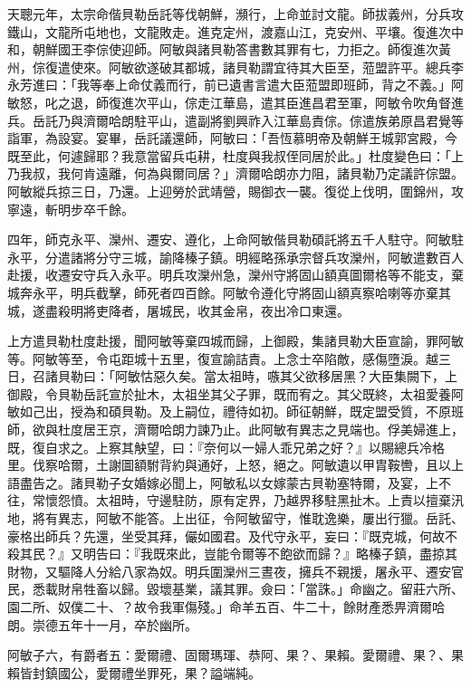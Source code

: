 \begin{pinyinscope}
天聰元年，太宗命偕貝勒岳託等伐朝鮮，瀕行，上命並討文龍。師拔義州，分兵攻鐵山，文龍所屯地也，文龍敗走。進克定州，渡嘉山江，克安州、平壤。復進次中和，朝鮮國王李倧使迎師。阿敏與諸貝勒答書數其罪有七，力拒之。師復進次黃州，倧復遣使來。阿敏欲遂破其都城，諸貝勒謂宜待其大臣至，蒞盟許平。總兵李永芳進曰：「我等奉上命仗義而行，前已遺書言遣大臣蒞盟即班師，背之不義。」阿敏怒，叱之退，師復進次平山，倧走江華島，遣其臣進昌君至軍，阿敏令吹角督進兵。岳託乃與濟爾哈朗駐平山，遣副將劉興祚入江華島責倧。倧遣族弟原昌君覺等詣軍，為設宴。宴畢，岳託議還師，阿敏曰：「吾恆慕明帝及朝鮮王城郭宮殿，今既至此，何遽歸耶？我意當留兵屯耕，杜度與我叔侄同居於此。」杜度變色曰：「上乃我叔，我何肯遠離，何為與爾同居？」濟爾哈朗亦力阻，諸貝勒乃定議許倧盟。阿敏縱兵掠三日，乃還。上迎勞於武靖營，賜御衣一襲。復從上伐明，圍錦州，攻寧遠，斬明步卒千餘。

四年，師克永平、灤州、遷安、遵化，上命阿敏偕貝勒碩託將五千人駐守。阿敏駐永平，分遣諸將分守三城，諭降榛子鎮。明經略孫承宗督兵攻灤州，阿敏遣數百人赴援，收遷安守兵入永平。明兵攻灤州急，灤州守將固山額真圖爾格等不能支，棄城奔永平，明兵截擊，師死者四百餘。阿敏令遵化守將固山額真察哈喇等亦棄其城，遂盡殺明將吏降者，屠城民，收其金帛，夜出冷口東還。

上方遣貝勒杜度赴援，聞阿敏等棄四城而歸，上御殿，集諸貝勒大臣宣諭，罪阿敏等。阿敏等至，令屯距城十五里，復宣諭詰責。上念士卒陷敵，感傷墮淚。越三日，召諸貝勒曰：「阿敏怙惡久矣。當太祖時，嗾其父欲移居黑？大臣集闕下，上御殿，令貝勒岳託宣於扯木，太祖坐其父子罪，既而宥之。其父既終，太祖愛養阿敏如己出，授為和碩貝勒。及上嗣位，禮待如初。師征朝鮮，既定盟受質，不原班師，欲與杜度居王京，濟爾哈朗力諫乃止。此阿敏有異志之見端也。俘美婦進上，既，復自求之。上察其觖望，曰：『奈何以一婦人乖兄弟之好？』以賜總兵冷格里。伐察哈爾，土謝圖額駙背約與通好，上怒，絕之。阿敏遺以甲胄鞍轡，且以上語盡告之。諸貝勒子女婚嫁必聞上，阿敏私以女嫁蒙古貝勒塞特爾，及宴，上不往，常懷怨憤。太祖時，守邊駐防，原有定界，乃越界移駐黑扯木。上責以擅棄汛地，將有異志，阿敏不能答。上出征，令阿敏留守，惟耽逸樂，屢出行獵。岳託、豪格出師兵？先還，坐受其拜，儼如國君。及代守永平，妄曰：『既克城，何故不殺其民？』又明告曰：『我既來此，豈能令爾等不飽欲而歸？』略榛子鎮，盡掠其財物，又驅降人分給八家為奴。明兵圍灤州三晝夜，擁兵不親援，屠永平、遷安官民，悉載財帛牲畜以歸。毀壞基業，議其罪。僉曰：「當誅。」命幽之。留莊六所、園二所、奴僕二十、？故令我軍傷殘。」命羊五百、牛二十，餘財產悉畀濟爾哈朗。崇德五年十一月，卒於幽所。

阿敏子六，有爵者五：愛爾禮、固爾瑪琿、恭阿、果？、果賴。愛爾禮、果？、果賴皆封鎮國公，愛爾禮坐罪死，果？謚端純。


\end{pinyinscope}
